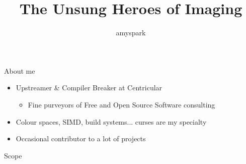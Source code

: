 \documentclass[aspectratio=169]{fireshonks}
\title{The Unsung Heroes of Imaging}
\author{amyspark}
\date{\DTMdate{2023-12-27}}
\begin{document}
\maketitle

\begin{frame}{About me}
  \begin{itemize}[<*>]
    \item Upstreamer \& Compiler Breaker at Centricular
      \begin{itemize}[<*>]
        \item Fine purveyors of Free and Open Source Software consulting
      \end{itemize}
    \item Colour spaces, SIMD, build systems... curses are my specialty 
    \item Occasional contributor to a lot of projects
  \end{itemize}
\end{frame}
\begin{frame}{Scope}
  \tableofcontents
\end{frame}
\end{document}
